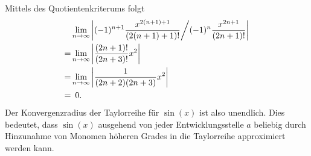 \documentclass{article}
\begin{document}
Mittels des Quotientenkriterums folgt
\begin{align*}
&\lim_{n \to \infty} \left| (-1)^{n+1} \frac{x^{2(n+1)+1}}{(2(n+1)+1)!} \bigg/ (-1)^n \frac{x^{2n+1}}{(2n+1)!} \right|\\
                   =& \lim_{n \to \infty} \left| \frac{(2n+1)!}{(2n+3)!} x^2\right|\\
		   =& \lim_{n \to \infty} \left| \frac{1}{(2n+2)(2n+3)} x^2\right|\\
		   =&\enskip 0\text{.} %
\end{align*}
Der Konvergenzradius der Taylorreihe für $\sin(x)$ ist also unendlich. Dies
bedeutet, dass $\sin(x)$ ausgehend von jeder Entwicklungsstelle $a$ beliebig
durch Hinzunahme von Monomen höheren Grades in die Taylorreihe approximiert
werden kann. 
\end{document}
